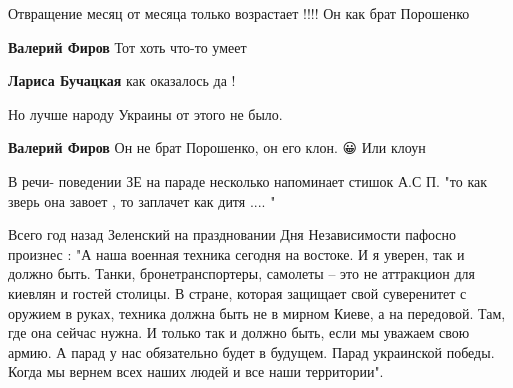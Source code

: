 \begin{itemize}
Отвращение месяц от месяца только возрастает !!!! Он как брат Порошенко

\begin{itemize}
 
\textbf{Валерий Фиров}
Тот хоть что-то умеет

 
\textbf{Лариса Бучацкая} как оказалось да !

 
Но лучше народу Украины от этого не было.

 
\textbf{Валерий Фиров} Он не брат Порошенко, он его клон. 😀 Или клоун🎃
\end{itemize}

 
В речи- поведении ЗЕ на параде несколько напоминает стишок А.С П. "то как зверь она завоет , то заплачет как дитя .... "

 

Всего год назад Зеленский на праздновании Дня Независимости пафосно произнес :
"А наша военная техника сегодня на востоке. И я уверен, так и должно быть.
Танки, бронетранспортеры, самолеты – это не аттракцион для киевлян и гостей
столицы. В стране, которая защищает свой суверенитет с оружием в руках, техника
должна быть не в мирном Киеве, а на передовой. Там, где она сейчас нужна. И
только так и должно быть, если мы уважаем свою армию. А парад у нас обязательно
будет в будущем. Парад украинской победы. Когда мы вернем всех наших людей и
все наши территории".


\end{itemize}
